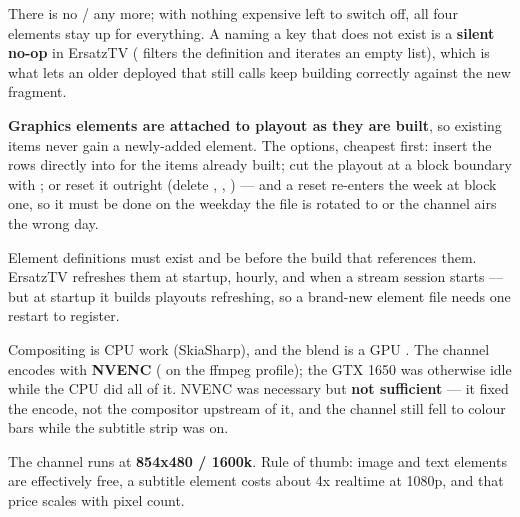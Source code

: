 \documentclass[fontpath=fonts/,logopath=logo/]{riposte-doc}
\begin{document}
There is no  /  any more; with nothing expensive left to switch off, all four elements stay up for everything. A  naming a key that does not exist is a \textbf{silent no-op} in ErsatzTV ( filters the definition and iterates an empty list), which is what lets an older deployed  that still calls  keep building correctly against the new fragment.

\textbf{Graphics elements are attached to playout  as they are built}, so existing items never gain a newly-added element. The options, cheapest first: insert the rows directly into  for the items already built; cut the playout at a block boundary with ; or reset it outright (delete , , ) — and a reset re-enters the week at block one, so it must be done on the weekday the file is rotated to or the channel airs the wrong day.

Element definitions must exist and be  before the build that references them. ErsatzTV refreshes them at startup, hourly, and when a stream session starts — but at startup it builds playouts  refreshing, so a brand-new element file needs one restart to register.



Compositing is CPU work (SkiaSharp), and the blend is a GPU . The channel encodes with \textbf{NVENC} ( on the ffmpeg profile); the GTX 1650 was otherwise idle while the CPU did all of it. NVENC was necessary but \textbf{not sufficient} — it fixed the encode, not the compositor upstream of it, and the channel still fell to colour bars while the subtitle strip was on.

The channel runs at \textbf{854x480 / 1600k}. Rule of thumb: image and text elements are effectively free, a subtitle element costs about 4x realtime at 1080p, and that price scales with pixel count.

\ripend
\end{document}
